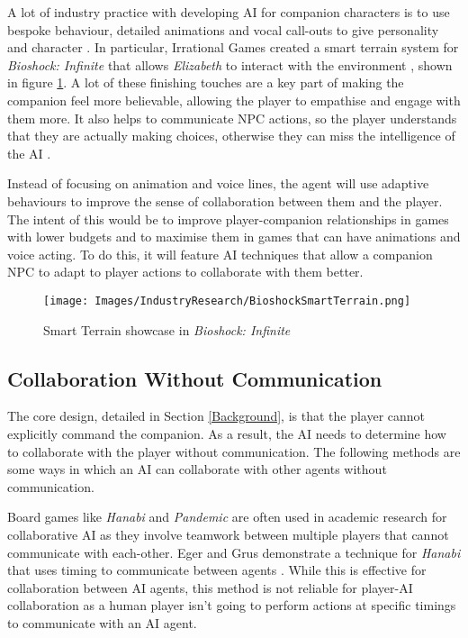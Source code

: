\documentclass{IEEEtran}
\begin{document}
A lot of industry practice with developing AI for companion characters is to use bespoke behaviour, detailed animations and vocal call-outs to give personality and character \cite{GAIP2EllieAI, GMTGoodAI, GAIPOReactions}. In particular, Irrational Games created a smart terrain system for \textit{Bioshock: Infinite} that allows \textit{Elizabeth} to interact with the environment \cite{GDCElizabeth, AIGamesBioshockAI}, shown in figure \ref{fig:BioshockSmartTerrain}. A lot of these finishing touches are a key part of making the companion feel more believable, allowing the player to empathise and engage with them more. It also helps to communicate NPC actions, so the player understands that they are actually making choices, otherwise they can miss the intelligence of the AI \cite{GMTGoodAI}.

Instead of focusing on animation and voice lines, the agent will use adaptive behaviours to improve the sense of collaboration between them and the player. The intent of this would be to improve player-companion relationships in games with lower budgets and to maximise them in games that can have animations and voice acting. To do this, it will feature AI techniques that allow a companion NPC to adapt to player actions to collaborate with them better.

\begin{figure}
  \centering
  \texttt{[image: Images/IndustryResearch/BioshockSmartTerrain.png]}
  
\caption{Smart Terrain showcase in \textit{Bioshock: Infinite}}
\label{fig:BioshockSmartTerrain}
\end{figure}

\subsection{Collaboration Without Communication}
\label{Communication}

The core design, detailed in Section \ref{Background}, is that the player cannot explicitly command the companion. As a result, the AI needs to determine how to collaborate with the player without communication. The following methods are some ways in which an AI can collaborate with other agents without communication.

Board games like \textit{Hanabi} and \textit{Pandemic} are often used in academic research for collaborative AI as they involve teamwork between multiple players that cannot communicate with each-other. Eger and Grus demonstrate a technique for \textit{Hanabi} that uses timing to communicate between agents \cite{WaitASecond2019}. While this is effective for collaboration between AI agents, this method is not reliable for player-AI collaboration as a human player isn't going to perform actions at specific timings to communicate with an AI agent.
\end{document}
